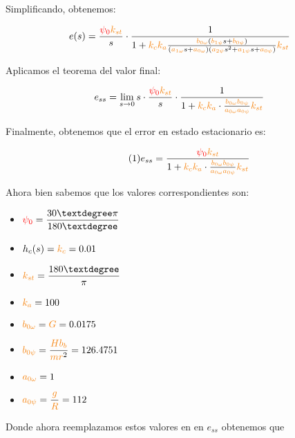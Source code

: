 Simplificando, obtenemos:

\begin{equation}
  e(s) = \frac{\rojo{\psi_0}\nara{k_{st}}}{s} \cdot \frac{1}{1+\nara{k_ck_a} \frac{\nara{\nara{b_{0\omega}}}\left(\nara{b_{1\psi}}s + \nara{b_{0\psi}}\right)}
  {\left(\nara{a_{1\omega}}s + \nara{a_{0\omega}}\right)\left(\nara{a_{2\psi}}s^{2} + \nara{a_{1\psi}}s + \nara{a_{0\psi}}\right)}\nara{k_{st}}}
\end{equation}


Aplicamos el teorema del valor final:

\begin{equation}
  e_{ss} = \lim_{s \to 0} s \cdot \frac{\rojo{\psi_0}\nara{k_{st}}}{s} \cdot \frac{1}{1 + \nara{k_c k_a} \cdot \frac{\nara{b_{0\omega}b_{0\psi}}}{\nara{a_{0\omega}a_{0\psi}}} \nara{k_{st}}}
\end{equation}


Finalmente, obtenemos que el error en estado estacionario es:


\begin{equation} \tag{1} \label{eq:e_ss_symbolic}
  e_{ss} = \frac{\rojo{\psi_0}\nara{k_{st}}}{1 + \nara{k_c k_a} \cdot \frac{\nara{b_{0\omega}b_{0\psi}}}{\nara{a_{0\omega}a_{0\psi}}} \nara{k_{st}}}
\end{equation}

Ahora bien sabemos que los valores correspondientes son:

\begin{multicols}{3}
  \begin{itemize}
    \item \( \rojo{\psi_0} = \displaystyle\frac{30° \pi}{180°} \)
    \item \(h_c(s) = \nara{k_c} = 0.01\)
    \item \(\nara{k_{st}} = \displaystyle\frac{180°}{\pi}\)
    \item \(\nara{k_{a}} = 100 \)
    \item \(\nara{b_{0\omega}} = \nara{G} =0.0175 \)
    \item \(\nara{b_{0\psi}} = \displaystyle\frac{\nara{Hb_b}}{\nara{mr}^2} = 126.4751\)
    \item \(\nara{a_{0\omega}} = 1 \)
    \item \(\nara{a_{0\psi}} = \displaystyle\frac{\nara{g}}{\nara{R}} =112 \)
  \end{itemize}
\end{multicols}


Donde ahora reemplazamos estos valores en  en \(e_{ss}\) obtenemos que 

